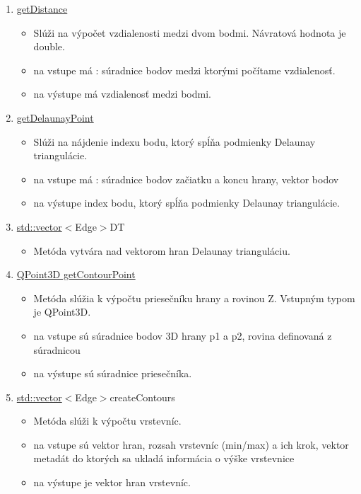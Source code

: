 \documentclass[12pt]{article}
\begin{document}
\begin{enumerate}
\item[] \underline{getDistance}
\begin{itemize}
\item Slúži na výpočet vzdialenosti medzi dvom bodmi. Návratová hodnota je double. 
\item na vstupe má : súradnice bodov medzi ktorými počítame vzdialenosť.
\item na výstupe má vzdialenosť medzi bodmi.
\end{itemize}

\item[] \underline{getDelaunayPoint}
\begin{itemize}
\item Slúži na nájdenie indexu bodu, ktorý spĺňa podmienky Delaunay triangulácie. 
\item na vstupe má : súradnice bodov začiatku a koncu hrany, vektor bodov
\item na výstupe index bodu, ktorý spĺňa podmienky Delaunay triangulácie.
\end{itemize}

\item[] \underline {std::vector}$<${Edge}$>${DT}
\begin{itemize}
\item Metóda vytvára nad vektorom hran Delaunay trianguláciu.
\end{itemize}

\item[] \underline{QPoint3D getContourPoint}
\begin{itemize}
\item Metóda slúžia k výpočtu priesečníku hrany a rovinou Z. Vstupným typom je QPoint3D.
\item na vstupe sú súradnice bodov 3D hrany p1 a p2, rovina definovaná z súradnicou 
\item na výstupe sú súradnice priesečníka.
\end{itemize}

\item[] \underline {std::vector}$<${Edge}$>${createContours}
\begin{itemize}
\item Metóda slúži k výpočtu vrstevníc.
\item na vstupe sú vektor hran, rozsah vrstevníc (min/max) a ich krok, vektor metadát do ktorých sa ukladá informácia o výške vrstevnice
\item na výstupe je vektor hran vrstevníc.
\end{itemize}


\end{enumerate}
\end{document}
